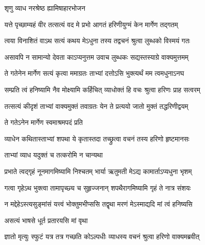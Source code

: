 

\onelineshloka
{शृणु व्याध नरश्रेष्ठ ह्यामिषाहारभोजन}%

\twolineshloka
{यत्ते पृच्छाम्यहं वीर तत्सत्यं वद मे प्रभो}
{आगतं हरिणीयुग्मं केन मार्गेण तद्गतम्}%

\twolineshloka
{त्वया विनाशितं वाऽथ सत्यं कथय मेऽधुना}
{तस्य तद्वचनं श्रुत्वा लुब्धको विस्मयं गतः}%

\twolineshloka
{असावपि न सामान्यो देवता काऽप्यनुत्तम}
{उवाच लुब्धकः सद्यस्तस्याग्रे वाक्यमुत्तमम्}%


\twolineshloka
{ते गतेनेन मार्गेण सत्यं कृत्वा ममाग्रतः}
{ताभ्यां दत्तोऽसि भुक्त्यर्थं मम त्वमधुनाऽनघ}%

\twolineshloka
{सम्प्रति त्वं हनिष्यामि नैव मोक्ष्यामि कर्हिचित्}
{व्याधोक्तं हि वचः श्रुत्वा हरिणः प्राह सत्वरम्}%


\twolineshloka
{तत्सत्यं कीदृशं ताभ्यां वाक्यमुक्तं तवाग्रतः}
{येन ते प्रत्ययो जातो मुक्तं तद्धरिणीद्वयम्}%



\onelineshloka
{ते गतेऽनेन मार्गेण स्वमाश्रमपदं प्रति}%

\twolineshloka
{व्याधेन कथितास्ताभ्यां शपथा ये कृतास्तदा}
{तच्छ्रुत्वा वचनं तस्य हरिणो हृष्टमानसः}%



\onelineshloka
{ताभ्यां व्याध यदुक्तं च तत्करोमि न चान्यथा}%

\twolineshloka
{प्रभाते त्वद्गृहं नूनमागमिष्यामि निश्चतम्}
{भार्या ऋतुमती मेऽद्य कामार्ताऽप्यधुना भृशम्}%

\twolineshloka
{गत्वा गृहेऽथ भुक्त्वा तामापृच्छ्य च सुहृज्जनान्}
{शपथैरागमिष्यामि गृहं ते नात्र संशयः}%

\twolineshloka
{न मद्देहेऽस्त्यसुङ्मांसं यत्त्वं भोक्तुमभीप्ससि}
{तद्वृथा मरणं मेऽस्माद्यदि मां त्वं हनिष्यसि}%


\onelineshloka
{असत्यं भाषसे धूर्त प्रतारयसि मां वृथा}%

\twolineshloka
{ज्ञातो मृत्युः स्फुटं यत्र तत्र गच्छति कोऽल्पधीः}
{व्याधस्य वचनं श्रुत्वा हरिणो वाक्यमब्रवीत्}%

